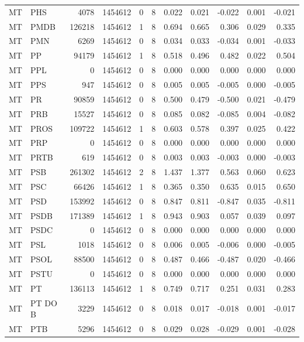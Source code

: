 \begin{landscape}
\begin{longtable}{llrrrrrrrrr}
MT & PHS & 4078 & 1454612 & 0 & 8 & 0.022 & 0.021 & -0.022 & 0.001 & -0.021 \\
MT & PMDB & 126218 & 1454612 & 1 & 8 & 0.694 & 0.665 & 0.306 & 0.029 & 0.335 \\
MT & PMN & 6269 & 1454612 & 0 & 8 & 0.034 & 0.033 & -0.034 & 0.001 & -0.033 \\
MT & PP & 94179 & 1454612 & 1 & 8 & 0.518 & 0.496 & 0.482 & 0.022 & 0.504 \\
MT & PPL & 0 & 1454612 & 0 & 8 & 0.000 & 0.000 & 0.000 & 0.000 & 0.000 \\
MT & PPS & 947 & 1454612 & 0 & 8 & 0.005 & 0.005 & -0.005 & 0.000 & -0.005 \\
MT & PR & 90859 & 1454612 & 0 & 8 & 0.500 & 0.479 & -0.500 & 0.021 & -0.479 \\
MT & PRB & 15527 & 1454612 & 0 & 8 & 0.085 & 0.082 & -0.085 & 0.004 & -0.082 \\
MT & PROS & 109722 & 1454612 & 1 & 8 & 0.603 & 0.578 & 0.397 & 0.025 & 0.422 \\
MT & PRP & 0 & 1454612 & 0 & 8 & 0.000 & 0.000 & 0.000 & 0.000 & 0.000 \\
MT & PRTB & 619 & 1454612 & 0 & 8 & 0.003 & 0.003 & -0.003 & 0.000 & -0.003 \\
MT & PSB & 261302 & 1454612 & 2 & 8 & 1.437 & 1.377 & 0.563 & 0.060 & 0.623 \\
MT & PSC & 66426 & 1454612 & 1 & 8 & 0.365 & 0.350 & 0.635 & 0.015 & 0.650 \\
MT & PSD & 153992 & 1454612 & 0 & 8 & 0.847 & 0.811 & -0.847 & 0.035 & -0.811 \\
MT & PSDB & 171389 & 1454612 & 1 & 8 & 0.943 & 0.903 & 0.057 & 0.039 & 0.097 \\
MT & PSDC & 0 & 1454612 & 0 & 8 & 0.000 & 0.000 & 0.000 & 0.000 & 0.000 \\
MT & PSL & 1018 & 1454612 & 0 & 8 & 0.006 & 0.005 & -0.006 & 0.000 & -0.005 \\
MT & PSOL & 88500 & 1454612 & 0 & 8 & 0.487 & 0.466 & -0.487 & 0.020 & -0.466 \\
MT & PSTU & 0 & 1454612 & 0 & 8 & 0.000 & 0.000 & 0.000 & 0.000 & 0.000 \\
MT & PT & 136113 & 1454612 & 1 & 8 & 0.749 & 0.717 & 0.251 & 0.031 & 0.283 \\
MT & PT DO B & 3229 & 1454612 & 0 & 8 & 0.018 & 0.017 & -0.018 & 0.001 & -0.017 \\
MT & PTB & 5296 & 1454612 & 0 & 8 & 0.029 & 0.028 & -0.029 & 0.001 & -0.028 \\

\end{longtable}
\end{landscape}
